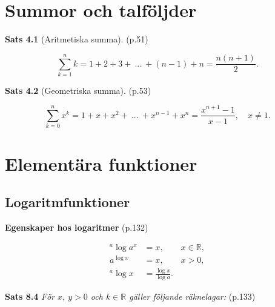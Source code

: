 \documentclass[11pt]{article}
\begin{document}
\section{Summor och talföljder}

\textbf{Sats 4.1} (Aritmetiska summa). (p.51)

\begin{equation}
    \sum_{k = 1}^n k = 1 + 2 + 3 +\ ...\ + (n - 1) + n = \frac{n(n + 1)}{2}.
\end{equation}

\textbf{Sats 4.2} (Geometriska summa). (p.53)

\begin{equation}
    \sum_{k = 0}^n x^k = 1 + x + x^2 +\ ...\ + x^{n - 1} + x^n = \frac{x^{n + 1} - 1}{x - 1}, \quad x \neq 1.
\end{equation}

%
%
%
%

\section{Elementära funktioner}

\subsection{Logaritmfunktioner}

\textbf{Egenskaper hos logaritmer} (p.132)

\begin{align}
    {}^a\log a^x &= x, \qquad x \in \mathbb{R},\\
    a^{\log x} &= x, \qquad x > 0,\\
    {}^a\log x &= \frac{\log{x}}{\log{a}}.
\end{align}

\textbf{Sats 8.4} \textit{För $x,\ y > 0$ och $k \in \mathbb{R}$ gäller följande räknelagar:} (p.133)
\end{document}
